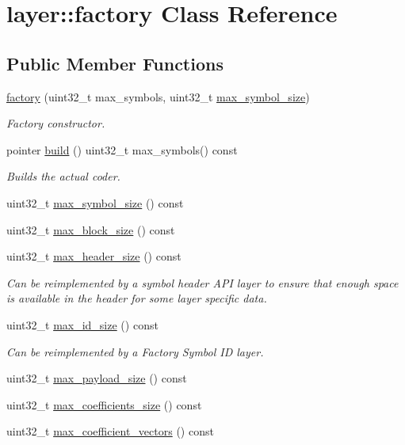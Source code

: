 \hypertarget{classlayer_1_1factory}{\section{layer\-:\-:factory Class Reference}
\label{classlayer_1_1factory}
}
\subsection*{Public Member Functions}
\begin{DoxyCompactItemize}
\item 
\hyperlink{group__factory__api_gadc3f7a87a26d462894f5ddc8cc0a75ab}{factory} (uint32\-\_\-t max\-\_\-symbols, uint32\-\_\-t \hyperlink{group__factory__api_ga23197967df1fb32d3b6102448194426b}{max\-\_\-symbol\-\_\-size})
\begin{DoxyCompactList}\small\item\em Factory constructor. \end{DoxyCompactList}\item 
pointer \hyperlink{group__factory__api_ga8ea258f22d2d2b7ae84b7ceb87559d43}{build} () uint32\-\_\-t max\-\_\-symbols() const 
\begin{DoxyCompactList}\small\item\em Builds the actual coder. \end{DoxyCompactList}\item 
uint32\-\_\-t \hyperlink{group__factory__api_ga23197967df1fb32d3b6102448194426b}{max\-\_\-symbol\-\_\-size} () const 
\item 
uint32\-\_\-t \hyperlink{group__storage__api_gab2971f553662b40204cf4cc3810cc28f}{max\-\_\-block\-\_\-size} () const 
\item 
uint32\-\_\-t \hyperlink{group__codec__header__api_ga7138ea5d64116c9594774e0a3806eece}{max\-\_\-header\-\_\-size} () const 
\begin{DoxyCompactList}\small\item\em Can be reimplemented by a symbol header A\-P\-I layer to ensure that enough space is available in the header for some layer specific data. \end{DoxyCompactList}\item 
uint32\-\_\-t \hyperlink{group__symbol__id__api_gaf38c199730c068ff1695f24067d19887}{max\-\_\-id\-\_\-size} () const 
\begin{DoxyCompactList}\small\item\em Can be reimplemented by a Factory Symbol I\-D layer. \end{DoxyCompactList}\item 
uint32\-\_\-t \hyperlink{group__payload__codec__api_gae38feedd50372252ded284d12bcf9dab}{max\-\_\-payload\-\_\-size} () const 
\item 
uint32\-\_\-t \hyperlink{group__coefficient__storage__api_ga4bf955840bac622c19cf19c0f8425cca}{max\-\_\-coefficients\-\_\-size} () const 
\item 
uint32\-\_\-t \hyperlink{group__coefficient__storage__api_ga82899f2e9bb1ac587ce04d480d9e3af8}{max\-\_\-coefficient\-\_\-vectors} () const 
\end{DoxyCompactItemize}


